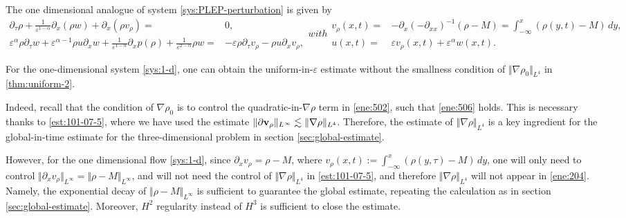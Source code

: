 \documentclass[11pt]{article}
\theoremstyle{plain}
\theoremstyle{definition}
\theoremstyle{remark}
\newcommand{\dx}{\partial_x}
\newcommand{\dtau}{\partial_\tau}
\renewcommand{\vec}[1]{{\bf #1}}
\newcommand{\norm}[2]{\Vert #1 \Vert_{#2}}
\numberwithin{equation}{section}
\begin{document}
The one dimensional analogue of system \eqref{sys:PLEP-perturbation} is given by
\begin{subequations}
    \label{sys:1-d}
    \begin{align}
        \label{eq:1-d-01}
        \dtau \rho + \frac{1}{\varepsilon^{1-\alpha}} \dx (\rho w) + \dx(\rho v_\rho) = & 0, \\
        \label{eq:1-d-02}
        \varepsilon^{\alpha} \rho \dtau w + \varepsilon^{\alpha-1} \rho u \dx w + \frac{1}{\varepsilon^{1-\alpha}} \dx p(\rho) + \frac{1}{\varepsilon^{2-\alpha}} \rho w = & - \varepsilon\rho \dtau v_\rho - \rho u \dx v_\rho,
    \end{align}
    with
    \begin{align}
        \label{eq:1-d-03}
        v_\rho(x,t) =& - \dx (-\partial_{xx})^{-1} (\rho - M)  = \int_{-\infty}^{x} (\rho(y,t)-M)\,dy,\\
        \label{eq:1-d-04}
        u(x,t) = & \varepsilon v_\rho(x,t) + \varepsilon^\alpha w(x,t). 
    \end{align}
\end{subequations}

For the one-dimensional system \eqref{sys:1-d}, one can obtain the uniform-in-$ \varepsilon $ estimate without the smallness condition of $ \norm{\nabla \rho_0}{L^4} $ in \ref{thm:uniform-2}. 

Indeed, recall that the condition of $ \nabla \rho_0 $ is to control the quadratic-in-$ \nabla \rho $ term in \eqref{ene:502}, such that \eqref{ene:506} holds. This is necessary thanks to \eqref{est:101-07-5}, where we have used the estimate $ \norm{\partial \vec v_\rho}{L^\infty} \lesssim \norm{\nabla\rho}{L^4}$. Therefore, the estimate of $ \norm{\nabla\rho}{L^4} $ is a key ingredient for the global-in-time estimate for the three-dimensional problem in section \ref{sec:global-estimate}. 

However, for the one dimensional flow \eqref{sys:1-d}, since $ \partial_x v_\rho = \rho - M $, where $ v_\rho(x,t) := \int_{-\infty}^{x} (\rho(y,\tau) - M)\,dy $, one will only need to control $ \norm{\partial_x v_\rho}{L^\infty} = \norm{\rho - M}{L^\infty} $, and will not need the control of $ \norm{\nabla\rho}{L^4} $ in \eqref{est:101-07-5}, and therefore $ \norm{\nabla \rho}{L^4} $ will not appear in \eqref{ene:204}. Namely, the exponential decay of $ \norm{\rho - M}{L^\infty} $ is sufficient to guarantee the global estimate, repeating the calculation as in section \ref{sec:global-estimate}. Moreover, $ H^2 $ regularity instead of $ H^3 $ is sufficient to close the estimate. 
\end{document}
